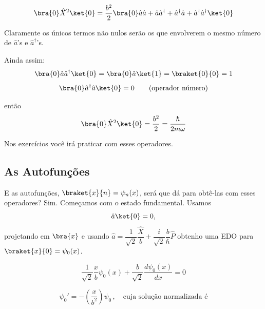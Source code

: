 \begin{equation}
    \bra{0}\hat{X}^2\ket{0} = \frac{b^2}{2}\bra{0}\hat{a}\hat{a} + \hat{a}\hat{a}^\dagger + \hat{a}^\dagger\hat{a} + \hat{a}^\dagger\hat{a}^\dagger\ket{0}
\label{eq:aula18_X2_estado_fund}
\end{equation}

Claramente os únicos termos não nulos serão os que envolverem o mesmo número de $\hat{a}$'s e $\hat{a}^\dagger$'s.

Ainda assim:
\begin{equation}
    \bra{0}\hat{a}\hat{a}^\dagger\ket{0} = \bra{0}\hat{a}\ket{1} = \braket{0}{0} = 1
\label{eq:aula18_aadagger_estado_fund}
\end{equation}
\begin{equation}
    \bra{0}\hat{a}^\dagger\hat{a}\ket{0} = 0 \qquad \text{(operador número)}
\label{eq:aula18_adaggera_estado_fund}
\end{equation}

então
\begin{equation}
    \bra{0}\hat{X}^2\ket{0} = \frac{b^2}{2} = \frac{\hbar}{2m\omega}
\label{eq:aula18_X2_resultado}
\end{equation}


Nos exercícios você irá praticar com esses operadores.

\subsection*{As Autofunções}

E as autofunções, $\braket{x}{n} = \psi_n(x)$, será que dá para obtê-las com esses operadores? Sim. Começamos com o estado fundamental. Usamos
\begin{equation}
    \hat{a}\ket{0} = 0,
\label{eq:aula18_a_ket0}
\end{equation}
projetando em $\bra{x}$ e usando $\hat{a} = \dfrac{1}{\sqrt{2}}\dfrac{\hat{X}}{b} + \dfrac{i}{\sqrt{2}}\dfrac{b}{\hbar}\hat{P}$ obtenho uma EDO para $\braket{x}{0} = \psi_0(x)$.

\begin{equation}
    \frac{1}{\sqrt{2}}\frac{x}{b}\psi_0(x) + \frac{b}{\sqrt{2}}\frac{d\psi_0(x)}{dx} = 0
\label{eq:aula18_edo_psi0}
\end{equation}

\begin{equation}
    \psi_0' = -\left( \frac{x}{b^2} \right)\psi_0 \, , \quad \text{cuja solução normalizada é}
\label{eq:aula18_edo_psi0_resolvida}
\end{equation}

